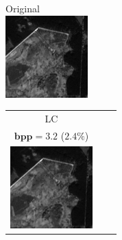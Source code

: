 \documentclass[runningheads]{llncs}
\begin{document}
\begin{figure}
\begin{minipage}{0.27\linewidth}
    \tiny
    Original\\
\includegraphics[width=1\linewidth]{figures/compression/original.png}
\end{minipage}
\tiny
\begin{tabular}{ccc}
   LC   & \begin{minipage}{0.27\linewidth}\tiny$n=1$\\$\textbf{bpp}=3.2$ ($2.4 \%$)\\ \includegraphics[width=\linewidth]{figures/compression/reconstruction2.png}   \end{minipage}%

\end{tabular}
\end{figure}
\end{document}
